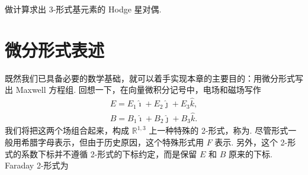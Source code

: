 \begin{question}\label{q:12-9}
做计算求出 3-形式基元素的 Hodge 星对偶.
\end{question}

\section{微分形式表述}

既然我们已具备必要的数学基础，就可以着手实现本章的主要目的：用微分形式写出 Maxwell 方程组. 回想一下，在向量微积分记号中，电场和磁场写作
\begin{align*}
E=E_1\hat{\imath}+E_2\hat{\jmath}+E_3\hat{k}, \\
B=B_1\hat{\imath}+B_2\hat{\jmath}+B_3\hat{k}.
\end{align*}
我们将把这两个场组合起来，构成 $\mathbb{R}^{1,3}$ 上一种特殊的 2-形式，称为. 尽管形式一般用希腊字母表示，但由于历史原因，这个特殊形式用 $F$ 表示. 另外，这个 2-形式的系数下标并不遵循 2-形式的下标约定，而是保留 $E$ 和 $B$ 原来的下标. Faraday 2-形式为

\begin{center}
\end{center}

